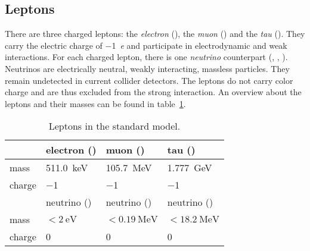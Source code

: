 \subsection{Leptons}
There are three charged leptons: the \emph{electron} (\Pe), the \emph{muon} (\Pmu) and the \emph{tau} (\Ptau). They carry the electric charge of \SI{-1}{\elementarycharge} and participate in electrodynamic and weak interactions. For each charged lepton, there is one \emph{neutrino} counterpart (\Pnue, \Pnum, \Pnut). Neutrinos are electrically neutral, weakly interacting, massless particles. They remain undetected in current collider detectors.
The leptons do not carry color charge and are thus excluded from the strong interaction.
An overview about the leptons and their masses can be found in table~\ref{tbl:sm_leptons}.

\begin{table}
	\centering
	\begin{tabular}{ l l l l }
		\toprule
		& {electron (\Pe)} & {muon (\Pmu)} & {tau (\Ptau)} \\
		\midrule
		{mass} & \SI{511.0}{\keV} & \SI{105.7}{\MeV} & \SI{1.777}{\GeV} \\
		{charge} & \num{-1} & \num{-1} & \num{-1} \\ 
		\midrule
		& {\Pe neutrino (\Pnue)} & {\Pmu neutrino (\Pnum)} & {\Ptau neutrino (\Pnut)} \\
		\midrule
		{mass} & $< \SI{2}{\eV}$ & $< \SI{0.19}{\MeV}$ & $< \SI{18.2}{\MeV}$ \\
		{charge} & \num{0} & \num{0} & \num{0} \\ 
		\bottomrule
	\end{tabular}
	\caption{Leptons in the standard model\cite[p.~30, p.~690f.]{Oo2014Review}.}
	\label{tbl:sm_leptons}
\end{table}
\enlargethispage{0.4cm}
